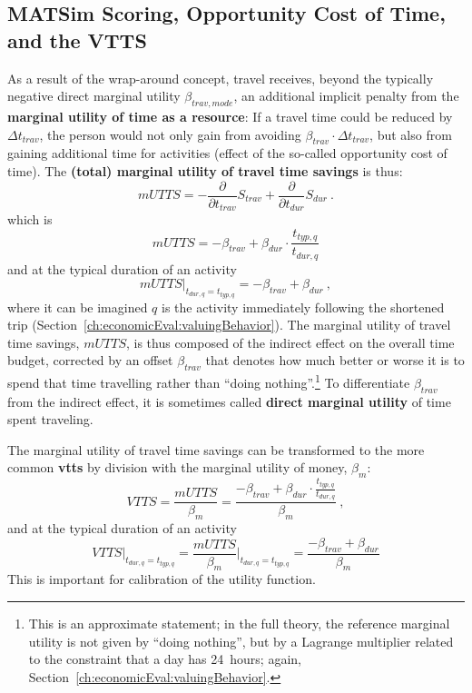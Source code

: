 \subsection{MATSim Scoring, Opportunity Cost of Time, and the VTTS}
\label{sec:opport-cost-of-time}
As a result of the wrap-around concept, travel receives, beyond the typically negative direct marginal utility $\beta_{trav, mode}$, an additional implicit penalty from the \textbf{marginal utility of time as a resource}:
If a travel time could be reduced by 
$\Delta t_{trav}$, the person would not only gain from avoiding $\beta_{trav} \cdot \Delta t_{trav}$, but also from gaining additional time for activities (effect of the so-called opportunity cost of time). The \textbf{(total) marginal utility of travel time savings} is thus:
%
\[
mUTTS = - \frac{\partial}{\partial t_{trav}} S_{trav} + \frac{\partial}{\partial t_{dur}}S_{dur} \ .
\]
which is
\begin{equation}
mUTTS = - \beta_{trav}
+  \beta_{dur} \cdot \frac{t_{typ,q}}{t_{dur,q}} 
\label{eq:mUTTSfull}
\end{equation}
and at the typical duration of an activity
\[
mUTTS \Big|_{t_{dur,q} = t_{typ,q}} = - \beta_{trav} + \beta_{dur} \ , 
\]
where it can be imagined $q$ is the activity immediately following the shortened trip (\cf Section~\ref{ch:economicEval:valuingBehavior}).
%
The marginal utility of travel time savings, $mUTTS$, is thus composed of the indirect effect on the overall time budget, corrected by an offset $\beta_{trav}$ that denotes how much better or worse it is to spend that time travelling rather than ``doing nothing''.\footnote{%
  This is an approximate statement; in the full theory, the reference marginal utility is not given by ``doing nothing'', but by a Lagrange multiplier related to the constraint that a day has 24~hours; again, \cf Section~\ref{ch:economicEval:valuingBehavior}.
} To differentiate $\beta_{trav}$ from the indirect effect, it is sometimes called \textbf{direct marginal utility} of time spent traveling.

 

The marginal utility of travel time savings
can be transformed to the more common \textbf{\acrfull{vtts}} by division with the marginal utility of money, $\beta_{m}$:
\[
VTTS = \frac{mUTTS}{\beta_{m}} = \frac{- \beta_{trav} + \beta_{dur} \cdot \frac{t_{typ,q}}{t_{dur,q}} }{\beta_{m}} \ ,
\]
and at the typical duration of an activity
\[
VTTS \Big|_{t_{dur,q} = t_{typ,q}} = \frac{mUTTS}{\beta_{m}} \Big|_{t_{dur,q} = t_{typ,q}} = \frac{- \beta_{trav} + \beta_{dur}}{\beta_{m}}
\]
This is important for calibration of the utility function.

